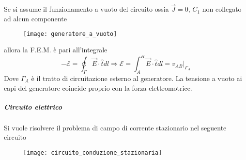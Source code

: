 Se si assume il funzionamento a vuoto del circuito ossia $\vec{J} = 
0$, $C_1$ non collegato ad alcun componente 
\begin{figure}[H]
\centering
\texttt{[image: generatore\_a\_vuoto]}
\end{figure}
allora la F.E.M. è pari all'integrale 
$$
-\mathcal{E} = \oint_\Gamma \vec{E}\cdot\hat{t}dl \Rightarrow 
\mathcal{E} = \int_A^B \vec{E}\cdot\hat{t}dl = \left.v_{AB}\right|_{\Gamma_A}
$$
Dove $\Gamma_A$ è il tratto di circuitazione esterno al 
generatore.
La tensione a vuoto ai capi del generatore coincide proprio 
con la forza elettromotrice.

\subparagraph{Circuito elettrico}
Si vuole risolvere il problema di campo di corrente
stazionario nel seguente circuito
\begin{figure}[H]
\centering
\texttt{[image: circuito\_conduzione\_stazionaria]}
\end{figure}

